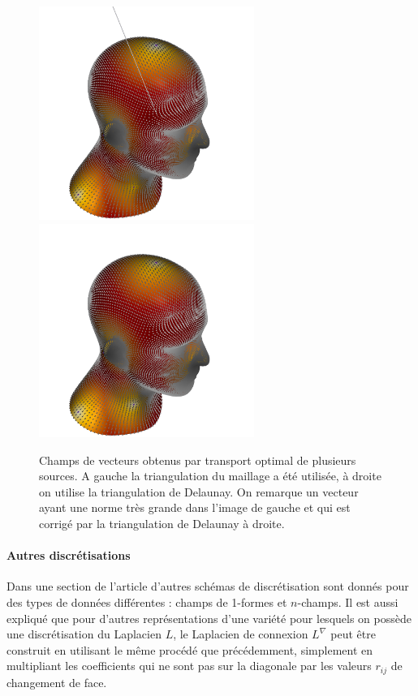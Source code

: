 \documentclass[11pt]{article}
\begin{document}
	\begin{figure}
		\centering
		\includegraphics[width=7cm]{face.png} \; \includegraphics[width=7cm]{face_delaunay.png}
		\caption{Champs de vecteurs obtenus par transport optimal de plusieurs sources. A gauche la triangulation du maillage a été utilisée, à droite on utilise la triangulation de Delaunay. On remarque un vecteur ayant une norme très grande dans l'image de gauche et qui est corrigé par la triangulation de Delaunay à droite.}
		\label{fig:norme_delaunay}
	\end{figure}

	\paragraph{Autres discrétisations}
	Dans une section de l'article d'autres schémas de discrétisation sont donnés pour des types de données différentes : champs de 1-formes et $n$-champs. Il est aussi expliqué que pour d'autres représentations d'une variété pour lesquels on possède une discrétisation du Laplacien $L$, le Laplacien de connexion $L^\nabla$ peut être construit en utilisant le même procédé que précédemment, simplement en multipliant les coefficients qui ne sont pas sur la diagonale par les valeurs $r_{ij}$ de changement de face.
	
\end{document}
